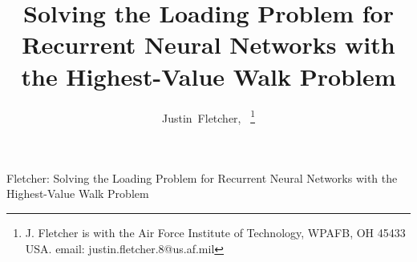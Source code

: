 \documentclass[journal]{IEEEtran}
\begin{document}
%
\title{Solving the Loading Problem for Recurrent Neural Networks with the Highest-Value Walk Problem}
%
%
%

\author{Justin~Fletcher,~
\thanks{J. Fletcher is with the Air Force Institute of Technology, WPAFB, OH 45433 USA. email: justin.fletcher.8@us.af.mil}%
}


% 
%



%
{Fletcher: Solving the Loading Problem for Recurrent Neural Networks with the Highest-Value Walk Problem}
% 
\end{document}
